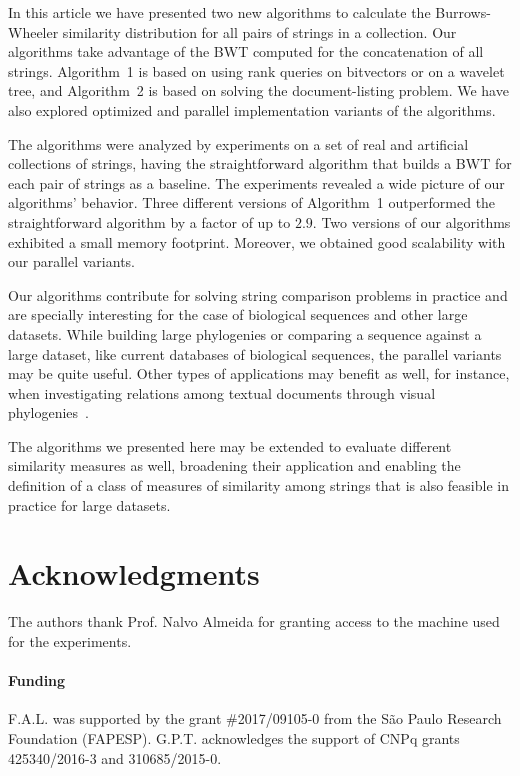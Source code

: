 \documentclass{elsarticle}
\begin{document}
In this article we have presented two new algorithms to calculate the
Burrows-Wheeler similarity distribution for all pairs of strings in a
collection.
Our algorithms take advantage of the BWT computed for the concatenation of all
strings.
Algorithm~1 is based on using rank queries on bitvectors or on a
wavelet tree, and Algorithm~2
is based on solving the document-listing problem.  We have also explored
optimized and parallel implementation variants of the algorithms.

The algorithms were analyzed by experiments on a set of real and artificial
collections of strings, having the straightforward algorithm that builds a
BWT for each pair of strings as a baseline.  The experiments revealed a
wide picture of our algorithms' behavior.  Three different versions of
Algorithm~1 outperformed the straightforward algorithm by a factor of up to
$2.9$.  Two versions of our algorithms exhibited a small memory footprint.
Moreover, we obtained good scalability with our parallel variants.

Our algorithms contribute for solving string comparison problems in
practice and are specially interesting for the case of biological sequences
and other large datasets.  While building large phylogenies or comparing a
sequence against a large dataset, like current databases of biological
sequences, the parallel variants may be quite useful.  Other types of
applications may benefit as well, for instance, when investigating
relations among textual documents through visual
phylogenies~\cite{2011-paiva}.

The algorithms we presented here may be extended to evaluate different
similarity measures as well, broadening their application and enabling the
definition of a class of measures of similarity among strings that is also
feasible in practice for large datasets.

\section*{Acknowledgments}
The authors thank Prof. Nalvo Almeida for granting access to the machine used
for the experiments.

\paragraph{Funding}
F.A.L. was supported by the grant $\#$2017/09105-0 from the S\~ao Paulo
Research Foundation (FAPESP).
G.P.T. acknowledges the support of CNPq grants 425340/2016-3 and 310685/2015-0.
\end{document}
